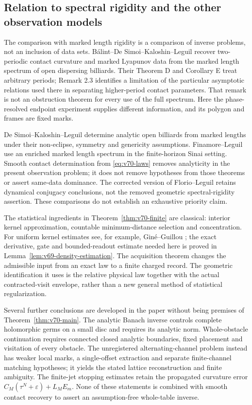 \subsection{Relation to spectral rigidity and the other observation models}

The comparison with marked length rigidity is a comparison of inverse
problems, not an inclusion of data sets.  B\'alint--De Simoi--Kaloshin--Leguil
\cite{BDKL} recover two-periodic contact curvature and marked Lyapunov
data from the marked length spectrum of open dispersing billiards.
Their Theorem D and Corollary E treat arbitrary periods; Remark 2.3
identifies a limitation of the particular asymptotic relations used
there in separating higher-period contact parameters.  That remark is
not an obstruction theorem for every use of the full spectrum.  Here
the phase-resolved endpoint experiment supplies different information,
and its polygon and frames are fixed marks.

De Simoi--Kaloshin--Leguil \cite{DSKL} determine analytic open billiards
from marked lengths under their non-eclipse, symmetry and genericity
assumptions.  Finamore--Leguil \cite{FinamoreLeguil} use an enriched
marked length spectrum in the finite-horizon Sinai setting.  Smooth
contact determination from \eqref{eq:v70-laws} removes analyticity
in the present observation problem; it does not remove hypotheses
from those theorems or assert same-data dominance.  The corrected
version of Florio--Leguil \cite{FlorioLeguil} retains dynamical
conjugacy conclusions, not the removed geometric spectral-rigidity
assertion.  These comparisons do not establish an exhaustive priority
claim.

The statistical ingredients in Theorem~\ref{thm:v70-finite} are classical:
interior kernel approximation, countable minimum-distance selection and
concentration.  For uniform kernel estimates see, for example,
Gin\'e--Guillou \cite{GineGuillou2002}; the exact derivative, gate and
bounded-readout estimate needed here is proved in
Lemma~\ref{lem:v69-density-estimation}.  The acquisition theorem changes
the admissible input from an exact law to a finite charged record.  The
geometric identification it uses is the relative physical law together
with the actual contracted-visit envelope, rather than a new general
method of statistical regularization.

Several further conclusions are developed in the paper without being
premises of Theorem~\ref{thm:v70-main}.  The analytic Banach inverse
controls complete holomorphic germs on a small disc and requires its
analytic norm.  Whole-obstacle continuation requires connected closed
analytic boundaries, fixed placement and visitation of every obstacle.
The unregistered alternating-channel problem instead has weaker local
marks, a single-offset extraction and separate finite-channel matching
hypotheses; it yields the stated lattice reconstruction and finite
ambiguity.  The finite-jet stopping estimates retain the propagated
curvature error $C_M(\tau^N+\varepsilon)+L_ME_m$.  None of these
statements is combined with smooth contact recovery to assert an
assumption-free whole-table inverse.

